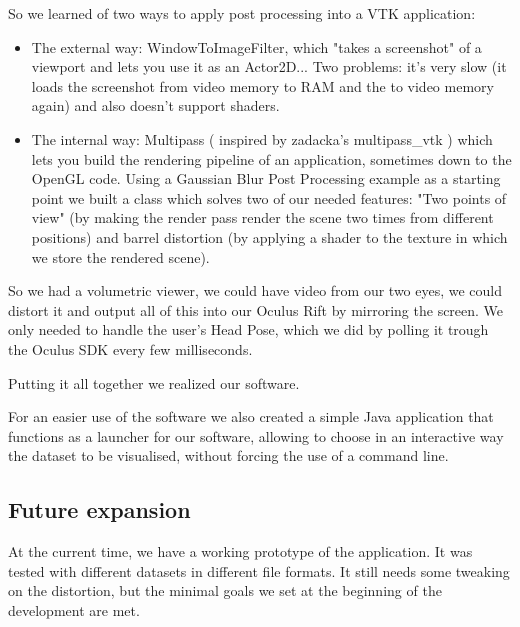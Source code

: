 \documentclass[11pt]{article} %
\begin{document}
So we learned of two ways to apply post processing into a VTK application:
\begin{itemize}
\item The external way: WindowToImageFilter, which "takes a screenshot" of a viewport and lets you use it as an Actor2D... Two problems: it's very slow (it loads the screenshot from video memory to RAM and the to video memory again) and also doesn't support shaders.
\item The internal way: Multipass ( inspired by zadacka's multipass\_vtk ) which lets you build the rendering pipeline of an application, sometimes down to the OpenGL code. Using a Gaussian Blur Post Processing example as a starting point we built a class which solves two of our needed features: "Two points of view" (by making the render pass render the scene two times from different positions) and barrel distortion (by applying a shader to the texture in which we store the rendered scene).
\end{itemize}
So we had a volumetric viewer, we could have video from our two eyes, we could distort it and output all of this into our Oculus Rift by mirroring the screen.
We only needed to handle the user's Head Pose, which we did by polling it trough the Oculus SDK every few milliseconds.

Putting it all together we realized our software.

For an easier use of the software we also created a simple Java application that functions as a launcher for our software, allowing to choose in an interactive way the dataset to be visualised, without forcing the use of a command line.

\subsection{Future expansion}
At the current time, we have a working prototype of the application. It was tested with different datasets in different file formats. It still needs some tweaking on the distortion, but the minimal goals we set at the beginning of the development are met.
\end{document}
